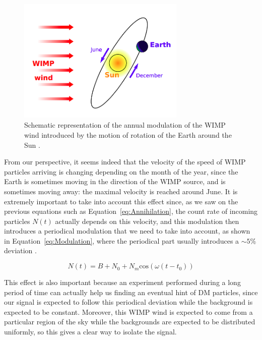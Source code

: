 \documentclass[a4paper, 10pt, openright]{report}
\begin{document}
\begin{figure}[htbp]
\begin{center}
\includegraphics[width=8cm, height=6cm]{figs/AnnualModulation.png}
\caption{Schematic representation of the annual modulation of the WIMP wind introduced by the motion of rotation of the Earth around the Sun \cite{AnnualModulation}.}
\label{fig:AnnualModulation}
\end{center}
\end{figure}

From our perspective, it seems indeed that the velocity of the speed of \ac{WIMP} particles arriving is changing depending on the month of the year, since the Earth is sometimes moving in the direction of the \ac{WIMP} source, and is sometimes moving away: the maximal velocity is reached around June. It is extremely important to take into account this effect since, as we saw on the previous equations such as Equation~\ref{eq:Annihilation}, the count rate of incoming particles $N(t)$ actually depends on this velocity, and this modulation then introduces a periodical modulation that we need to take into account, as shown in Equation~\ref{eq:Modulation}, where the periodical part usually introduces a $\sim5$\% deviation \cite{DirectSearches}.

\begin{equation}
\label{eq:Modulation}
N(t) = B + N_0 + N_m \text{cos}(\omega (t-t_0))
\end{equation}

This effect is also important because an experiment performed during a long period of time can actually help us finding an eventual hint of \ac{DM} particles, since our signal is expected to follow this periodical deviation while the background is expected to be constant. Moreover, this \ac{WIMP} wind is expected to come from a particular region of the sky while the backgrounds are expected to be distributed uniformly, so this gives a clear way to isolate the signal.
\end{document}
